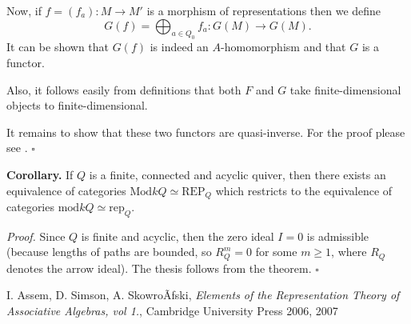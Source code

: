 \documentclass[12pt]{article}
\begin{document}
Now, if $f=(f_a):M\to M'$ is a morphism of representations then we define
$$G(f)=\bigoplus_{a\in Q_0}f_a:G(M)\to G(M).$$
It can be shown that $G(f)$ is indeed an $A$-homomorphism and that $G$ is a functor.

Also, it follows easily from definitions that both $F$ and $G$ take finite-dimensional objects to finite-dimensional.

It remains to show that these two functors are quasi-inverse. For the proof please see \cite[Theorem 1.6]{ASS}. $\square$

\textbf{Corollary.} If $Q$ is a finite, connected and acyclic quiver, then there exists an equivalence of categories $\mathrm{Mod}kQ\simeq\mathrm{REP}_{Q}$ which restricts to the equivalence of categories $\mathrm{mod}kQ\simeq\mathrm{rep}_{Q}$.

\textit{Proof.} Since $Q$ is finite and acyclic, then the zero ideal $I=0$ is admissible (because lengths of paths are bounded, so $R_Q^m=0$ for some $m\geqslant 1$, where $R_Q$ denotes the arrow ideal). The thesis follows from the theorem. $\square$

\begin{thebibliography}{99}
 I. Assem, D. Simson, A. SkowroÃƒski, \textit{Elements of the Representation Theory of Associative Algebras, vol 1.}, Cambridge University Press 2006, 2007
\end{thebibliography}

\end{document}
